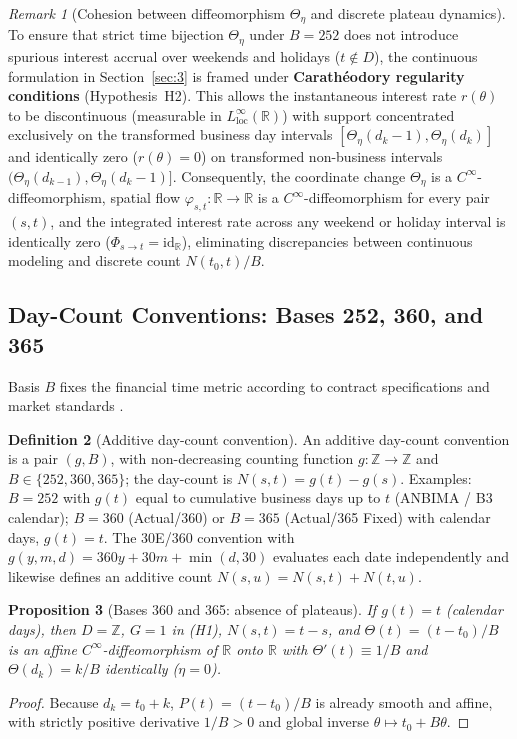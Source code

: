 \documentclass[11pt, a4paper]{article}
\theoremstyle{definition}
\newtheorem{definicao}{Definition}[section]
\theoremstyle{plain}
\newtheorem{proposicao}[definicao]{Proposition}
\theoremstyle{remark}
\newtheorem{observacao}[definicao]{Remark}
\begin{document}
\begin{observacao}[Cohesion between diffeomorphism $\Theta_\eta$ and discrete plateau dynamics]\label{obs:2.3}
To ensure that strict time bijection $\Theta_\eta$ under $B = 252$ does not introduce spurious interest accrual over weekends and holidays ($t \notin D$), the continuous formulation in Section~\ref{sec:3} is framed under \textbf{Carathéodory regularity conditions} (Hypothesis~H2). This allows the instantaneous interest rate $r(\theta)$ to be discontinuous (measurable in $L^\infty_{\text{loc}}(\mathbb{R})$) with support concentrated exclusively on the transformed business day intervals $[\Theta_\eta(d_k - 1), \Theta_\eta(d_k)]$ and identically zero ($r(\theta) = 0$) on transformed non-business intervals $(\Theta_\eta(d_{k-1}), \Theta_\eta(d_k - 1)]$. Consequently, the coordinate change $\Theta_\eta$ is a $C^\infty$-diffeomorphism, spatial flow $\varphi_{s,t} : \mathbb{R} \to \mathbb{R}$ is a $C^\infty$-diffeomorphism for every pair $(s,t)$, and the integrated interest rate across any weekend or holiday interval is identically zero ($\Phi_{s \to t} = \mathrm{id}_{\mathbb{R}}$), eliminating discrepancies between continuous modeling and discrete count $N(t_0, t)/B$.
\end{observacao}

\subsection{Day-Count Conventions: Bases 252, 360, and 365}\label{sec:2.1}

Basis $B$ fixes the financial time metric according to contract specifications and market standards \cite{AssafNeto, Fabozzi2006, ISDA2006}.

\begin{definicao}[Additive day-count convention]\label{def:2.4}
An additive day-count convention is a pair $(g, B)$, with non-decreasing counting function $g : \mathbb{Z} \to \mathbb{Z}$ and $B \in \{252, 360, 365\}$; the day-count is $N(s,t) = g(t) - g(s)$. Examples: $B = 252$ with $g(t)$ equal to cumulative business days up to $t$ (ANBIMA / B3 calendar); $B = 360$ (Actual/360) or $B = 365$ (Actual/365 Fixed) with calendar days, $g(t) = t$. The 30E/360 convention with $g(y,m,d) = 360y + 30m + \min(d, 30)$ evaluates each date independently and likewise defines an additive count $N(s,u) = N(s,t) + N(t,u)$.
\end{definicao}

\begin{proposicao}[Bases 360 and 365: absence of plateaus]\label{prop:2.5}
If $g(t) = t$ (calendar days), then $D = \mathbb{Z}$, $G = 1$ in (H1), $N(s,t) = t - s$, and $\Theta(t) = (t - t_0)/B$ is an affine $C^\infty$-diffeomorphism of $\mathbb{R}$ onto $\mathbb{R}$ with $\Theta'(t) \equiv 1/B$ and $\Theta(d_k) = k/B$ identically ($\eta = 0$).
\end{proposicao}
\begin{proof}
Because $d_k = t_0 + k$, $P(t) = (t - t_0)/B$ is already smooth and affine, with strictly positive derivative $1/B > 0$ and global inverse $\theta \mapsto t_0 + B\theta$.
\end{proof}
\end{document}

